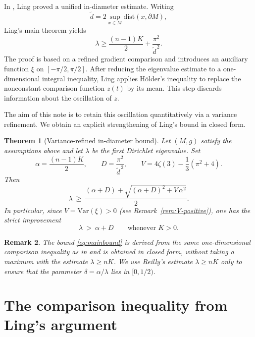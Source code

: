 \documentclass[11pt]{article}
\newtheorem{theorem}{Theorem}[section]
\newtheorem{remark}[theorem]{Remark}
\newcommand{\Var}{\mathrm{Var}}
\newcommand{\de}{\tilde d}
\begin{document}
In \cite{Ling2006}, Ling proved a unified in-diameter estimate.
Writing
\begin{equation}
\de = 2\sup_{x\in M}\mathrm{dist}(x,\partial M),
\end{equation}
Ling's main theorem yields
\begin{equation}
\lambda \ge \frac{(n-1)K}{2}+\frac{\pi^2}{\de^{\,2}}.
\end{equation}
The proof is based on a refined gradient comparison and introduces an auxiliary function $\xi$ on $[-\pi/2,\pi/2]$.
After reducing the eigenvalue estimate to a one-dimensional integral inequality, Ling applies H\"older's inequality to replace the nonconstant comparison function $z(t)$ by its mean.
This step discards information about the oscillation of $z$.

The aim of this note is to retain this oscillation quantitatively via a variance refinement.
We obtain an explicit strengthening of Ling's bound in closed form.

\begin{theorem}[Variance-refined in-diameter bound]
\label{thm:main}
Let $(M,g)$ satisfy the assumptions above and let $\lambda$ be the first Dirichlet eigenvalue.
Set
\begin{equation}
\alpha = \frac{(n-1)K}{2},
\qquad
D=\frac{\pi^2}{\de^{\,2}},
\qquad
V = 4\zeta(3)-\frac{1}{3}(\pi^2+4).
\end{equation}
Then
\begin{equation}
\label{eq:mainbound}
\lambda\ \ge\
\frac{(\alpha+D)+\sqrt{(\alpha+D)^2+V\,\alpha^2}}{2}.
\end{equation}
In particular, since $V=\Var(\xi)>0$ (see Remark~\ref{rem:V-positive}), one has the strict improvement
\begin{equation}
\lambda\ >\ \alpha + D
\qquad
\text{whenever }K>0.
\end{equation}
\end{theorem}

\begin{remark}
The bound \eqref{eq:mainbound} is derived from the same one-dimensional comparison inequality as in \cite{Ling2006} and is obtained in closed form, without taking a maximum with the estimate $\lambda\ge nK$.
We use Reilly's estimate $\lambda\ge nK$ only to ensure that the parameter $\delta=\alpha/\lambda$ lies in $[0,1/2)$.
\end{remark}

\section{The comparison inequality from Ling's argument}
\end{document}
